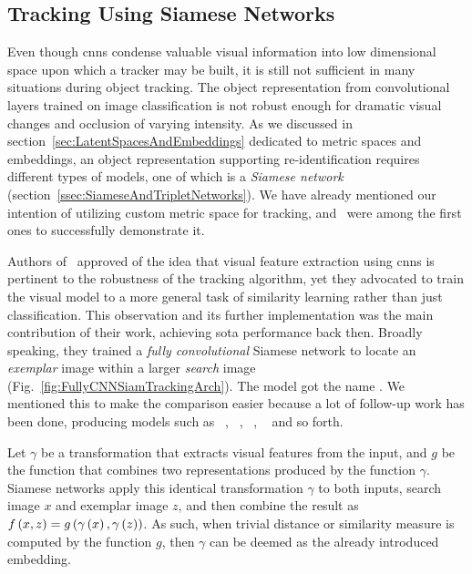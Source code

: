 \subsection{Tracking Using Siamese Networks}
\label{ssec:TrackingUsingSiameseNetworks}

Even though \glspl{cnn} condense valuable visual information into low dimensional space upon which a tracker may be built, it is still not sufficient in many situations during object tracking. The object representation from convolutional layers trained on image classification is not robust enough for dramatic visual changes and occlusion of varying intensity. As we discussed in section~\ref{sec:LatentSpacesAndEmbeddings} dedicated to metric spaces and embeddings, an object representation supporting re-identification requires different types of models, one of which is a \emph{Siamese network} (section~\ref{ssec:SiameseAndTripletNetworks}). We have already mentioned our intention of utilizing custom metric space for tracking, and~\cite{bertinetto2016siamfc} were among the first ones to successfully demonstrate it.

Authors of~\cite{bertinetto2016siamfc} approved of the idea that visual feature extraction using \glspl{cnn} is pertinent to the robustness of the tracking algorithm, yet they advocated to train the visual model to a more general task of similarity learning rather than just classification. This observation and its further implementation was the main contribution of their work, achieving \gls{sota} performance back then. Broadly speaking, they trained a \emph{fully convolutional} Siamese network to locate an \emph{exemplar} image within a larger \emph{search} image (Fig.~\ref{fig:FullyCNNSiamTrackingArch}). The model got the name . We mentioned this to make the comparison easier because a lot of follow-up work has been done, producing models such as ~\cite{he2018twofoldsiam}, ~\cite{li2018siamrpn}, ~\cite{wang2019siammask}, ~\cite{chen2019rotbboxes} and so forth.

Let $\gamma$ be a transformation that extracts visual features from the input, and $g$ be the function that combines two representations produced by the function $\gamma$. Siamese networks apply this identical transformation $\gamma$ to both inputs, search image $x$ and exemplar image $z$, and then combine the result as ${f} \left( x, z \right) = {g} \left( {\gamma} \left( x \right), {\gamma} \left( z \right) \right)$. As such, when trivial distance or similarity measure is computed by the function $g$, then $\gamma$ can be deemed as the already introduced embedding.

